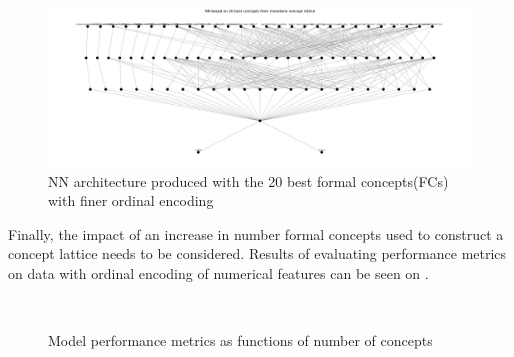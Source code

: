 \documentclass[14pt,a4paper]{extarticle}
\begin{document}
	\begin{figure}[h]
		\centering
		\includegraphics[width=\textwidth]{media/employees/NN_architecture_20concepts.png}
		\caption{NN architecture produced with the 20 best formal concepts(FCs) with finer ordinal encoding}
		\label{fig:20concepts-coarse}
	\end{figure}
	
	Finally, the impact of an increase in number formal concepts used to construct a concept lattice needs to be considered. Results of evaluating performance metrics on data with ordinal encoding of numerical features can be seen on .  
	
	\begin{figure}[h]
		\centering
		\\ 
		\caption{Model performance metrics as functions of number of concepts}
		\label{fig:metrix}
	\end{figure}
	
	\newpage
	
\end{document}
